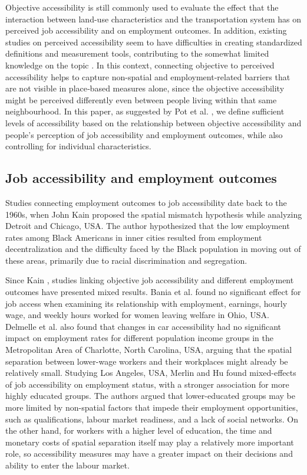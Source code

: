 \documentclass[preprint, 3p,
authoryear]{elsarticle} %
\begin{document}
Objective accessibility is still commonly used to evaluate the effect
that the interaction between land-use characteristics and the
transportation system has on perceived job accessibility and on
employment outcomes. In addition, existing studies on perceived
accessibility seem to have difficulties in creating standardized
definitions and measurement tools, contributing to the somewhat limited
knowledge on the topic \citep{negm2025}. In this context, connecting
objective to perceived accessibility helps to capture non-spatial and
employment‑related barriers that are not visible in place‑based measures
alone, since the objective accessibility might be perceived differently
even between people living within that same neighbourhood. In this
paper, as suggested by Pot et al. \citeyearpar{pot2025}, we define
sufficient levels of accessibility based on the relationship between
objective accessibility and people's perception of job accessibility and
employment outcomes, while also controlling for individual
characteristics.

\subsection{Job accessibility and employment
outcomes}\label{job-accessibility-and-employment-outcomes}

Studies connecting employment outcomes to job accessibility date back to
the 1960s, when John Kain \citeyearpar{kain1968} proposed the spatial
mismatch hypothesis while analyzing Detroit and Chicago, USA. The author
hypothesized that the low employment rates among Black Americans in
inner cities resulted from employment decentralization and the
difficulty faced by the Black population in moving out of these areas,
primarily due to racial discrimination and segregation.

Since Kain \citeyearpar{kain1968}, studies linking objective job
accessibility and different employment outcomes have presented mixed
results. Bania et al. \citeyearpar{bania2008} found no significant
effect for job access when examining its relationship with employment,
earnings, hourly wage, and weekly hours worked for women leaving welfare
in Ohio, USA. Delmelle et al. \citeyearpar{delmelle2021} also found that
changes in car accessibility had no significant impact on employment
rates for different population income groups in the Metropolitan Area of
Charlotte, North Carolina, USA, arguing that the spatial separation
between lower-wage workers and their workplaces might already be
relatively small. Studying Los Angeles, USA, Merlin and Hu
\citeyearpar{merlin2017} found mixed-effects of job accessibility on
employment status, with a stronger association for more highly educated
groups. The authors argued that lower-educated groups may be more
limited by non-spatial factors that impede their employment
opportunities, such as qualifications, labour market readiness, and a
lack of social networks. On the other hand, for workers with a higher
level of education, the time and monetary costs of spatial separation
itself may play a relatively more important role, so accessibility
measures may have a greater impact on their decisions and ability to
enter the labour market.
\end{document}
